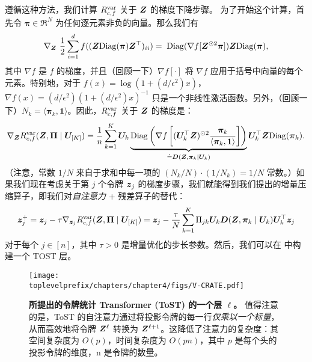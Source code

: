 \documentclass[../../book-main.tex]{subfiles}
\begin{document}
遵循这种方法，我们计算 $R_{c,f}^{\rm var}$ 关于 $\bm{Z}$ 的梯度下降步骤。
为了开始这个计算，首先令 $\bm \pi \in \Re^N$ 为任何逐元素非负的向量。那么我们有
\begin{equation}\label{eq1:grad Rcf}
\nabla_{\Z} \ \frac{1}{2} \sum_{i = 1}^{d} f(  (\Z \mathrm{Diag}(\bm \pi) \Z^{\top} )_{ii}) %
= \; \mathrm{Diag}(\nabla f[ \Z^{\odot 2} \bm \pi] ) \Z \mathrm{Diag}(\bm \pi),
\end{equation}
%
其中 $\nabla f$ 是 $f$ 的梯度，并且（回顾一下）$\nabla f[\cdot]$ 将 $\nabla f$ 应用于括号中向量的每个元素。特别地，对于 $ f(x) = \log(1 + (d/\epsilon^{2}) x)$，$\nabla f(x) = (d / \epsilon^{2}) (1+ (d / \epsilon^{2}) x)^{-1}$ 只是一个非线性激活函数。另外，（回顾一下）$N_{k} = \langle \bm \pi_{k}, \bm 1\rangle$。因此，$R^{\rm var}_{c,f}$ 关于 $\bm{Z}$ 的梯度是：
\begin{align}\label{eq2:grad Rcf}
    \nabla_{\bm{Z}} R^{\rm var}_{c,f}(\bm{Z},\bm \Pi \mid \bm U_{[K]}) =  \frac{1}{n} \sum_{k=1}^K \bm U_{k} \underbrace{\mathrm{Diag} \left( \nabla f\left[ (\bm U_{k}^{\top} \bm{Z})^{\odot 2}  \frac{\bm \pi_k}{\langle \bm \pi_{k}, \bm 1\rangle} \right] \right)}_{\doteq \bm D(\bm{Z}, \bm \pi_{k} \mid \bm U_{k})} \bm U_{k}^{\top} \bm{Z} \mathrm{Diag}(\bm \pi_k).
\end{align}
（注意，常数 $1/N$ 来自于求和中每一项的 $(N_{k}/N)\cdot (1/N_{k}) = 1/N$ 常数。）如果我们现在考虑关于第 $j$ 个令牌 $\bm{z}_j$ 的梯度步骤，我们就能得到我们提出的增量压缩算子，即我们对\textit{自注意力} + 残差算子的替代：
%
\vspace{-2mm}
\begin{equation}\label{eq:layer-operation-orig}
    \bm{z}_j^+ = \bm{z}_{j} - \tau \nabla_{\bm{z}_{j}}R_{c, f}^{\rm var}(\bm{Z}, \bm \Pi \mid \bm U_{[K]}) = \bm{z}_j - \frac{\tau}{N} \sum_{k=1}^K \Pi_{jk} \bm U_{k} \bm D(\bm{Z}, \bm \pi_{k} \mid \bm U_{k}) \bm U_{k}^{\top} \bm{z}_j
\end{equation}
对于每个 \(j \in [n]\)，其中 $\tau > 0$ 是增量优化的步长参数。然后，我们可以在  中构建一个 TOST 层。

\begin{figure}[t]
    \centering \texttt{[image: \\toplevelprefix/chapters/chapter4/figs/V-CRATE.pdf]}
    \vspace{-1mm}
    \caption{\small \textbf{所提出的令牌统计 Transformer (ToST) 的一个层 $\ell$。} 值得注意的是，ToST 的自注意力通过将投影令牌的每一行\textit{仅乘以一个标量}，从而高效地将令牌 $\bm{Z}^{\ell}$ 转换为 $\bm{Z}^{\ell+1}$。这降低了注意力的复杂度：其空间复杂度为 $O(p)$，时间复杂度为 $O(pn)$，其中 $p$ 是每个头的投影令牌的维度，n 是令牌的数量。
    }
    \label{fig:vcrate-architecture}
\end{figure}
\end{document}
